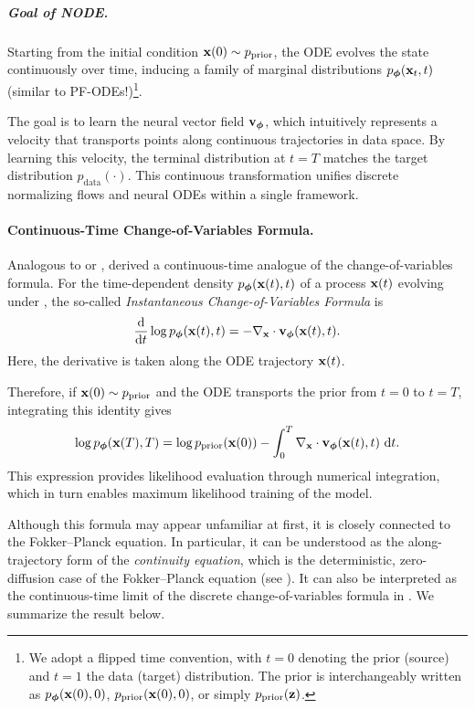 \subparagraph{Goal of NODE.}
Starting from the initial condition ${\mathbf{x}}(0) \sim p_{\text{prior}}$, the ODE evolves the state continuously over time, inducing a family of marginal distributions $p_{\bm{\phi}}({\mathbf{x}}_t, t)$ (similar to PF-ODEs!)\footnote{We adopt a flipped time convention, with $t = 0$ denoting the prior (source) and $t = 1$ the data (target) distribution. The prior is interchangeably written as $p_{\bm{\phi}}({\mathbf{x}}(0), 0)$, $p_{\text{prior}}({\mathbf{x}}(0), 0)$, or simply $p_{\text{prior}}({\mathbf{z}})$.
}. 

The goal is to learn the neural vector field ${\mathbf{v}}_{\bm{\phi}}$, which intuitively represents a velocity that transports points along continuous trajectories in data space. By learning this velocity, the terminal distribution at $t=T$ matches the target distribution $p_{\mathrm{data}}(\cdot)$. This continuous transformation unifies discrete normalizing flows and neural ODEs within a single framework.



\paragraph{Continuous-Time Change-of-Variables Formula.}
Analogous to  or ,
\citet{chen2018neural} derived a continuous-time analogue of the
change-of-variables formula. For the time-dependent density
$p_{\bm{\phi}}({\mathbf{x}}(t),t)$ of a process ${\mathbf{x}}(t)$ evolving under
, the so-called \emph{Instantaneous
Change-of-Variables Formula} is
\[
\frac{\mathop{}\!\mathrm{d}}{\mathop{}\!\mathrm{d} t}
\log p_{\bm{\phi}}({\mathbf{x}}(t),t)
=
-\nabla_{{\mathbf{x}}}\cdot
{\mathbf{v}}_{\bm{\phi}}({\mathbf{x}}(t),t).
\]
Here, the derivative is taken along the ODE trajectory ${\mathbf{x}}(t)$.

Therefore, if ${\mathbf{x}}(0)\sim p_{\mathrm{prior}}$ and the ODE transports the
prior from $t=0$ to $t=T$, integrating this identity gives
\begin{align}\label{eq:NODE-likelihood}
\log p_{\bm{\phi}}({\mathbf{x}}(T),T)
=
\log p_{\mathrm{prior}}({\mathbf{x}}(0))
-
\int_0^T
\nabla_{{\mathbf{x}}}\cdot
{\mathbf{v}}_{\bm{\phi}}({\mathbf{x}}(t),t)
\,\mathop{}\!\mathrm{d} t.
\end{align}
This expression provides likelihood evaluation through numerical integration,
which in turn enables maximum likelihood training of the model.

Although this formula may appear unfamiliar at first, it is closely connected
to the Fokker--Planck equation. In particular, it can be understood as the
along-trajectory form of the \emph{continuity equation}, which is the
deterministic, zero-diffusion case of the Fokker--Planck equation
(see ). It can also be interpreted as the continuous-time
limit of the discrete change-of-variables formula in
. We summarize the result below.

